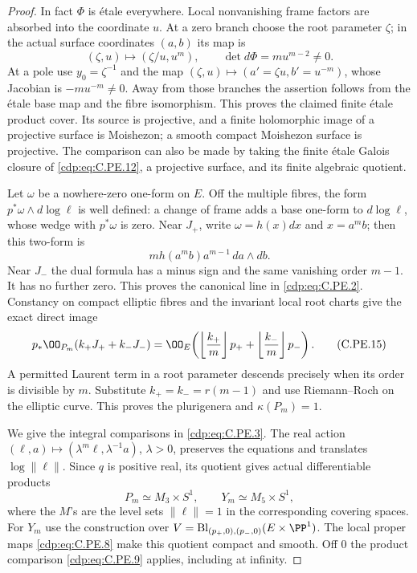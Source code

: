 \begin{proof}
In fact $\Phi$ is \'etale everywhere. Local nonvanishing
frame factors are absorbed into the coordinate $u$.
At a zero branch choose the root parameter $\zeta$;
in the actual surface coordinates
$(a,b)$ its map is
\[
             (\zeta,u)\longmapsto(\zeta/u,u^m),
             \qquad \det d\Phi=m u^{m-2}\ne0.           \tag{C.PE.13}\label{cdp:eq:C.PE.13}
\]
At a pole use $y_0=\zeta^{-1}$ and the map
$(\zeta,u)\mapsto(a'=\zeta u,b'=u^{-m})$, whose
Jacobian is $-m u^{-m}\ne0$. Away from those branches
the assertion follows from the \'etale base map and
the fibre isomorphism. This proves the claimed finite
\'etale product cover. Its source is projective, and
a finite holomorphic image of a projective surface is
Moishezon; a smooth compact Moishezon surface is
projective. The comparison can also be made by taking
the finite \'etale Galois closure of \eqref{cdp:eq:C.PE.12}, a
projective surface, and its finite algebraic quotient.

Let $\omega$ be a nowhere-zero one-form on $E$.
Off the multiple fibres, the form
$p^*\omega\wedge d\log\ell$ is well defined: a change
of frame adds a base one-form to $d\log\ell$, whose
wedge with $p^*\omega$ is zero. Near $J_+$, write
$\omega=h(x)dx$ and $x=a^m b$; then this two-form is
\[
                m h(a^m b)a^{m-1}\,da\wedge db.         \tag{C.PE.14}\label{cdp:eq:C.PE.14}
\]
Near $J_-$ the dual formula has a minus sign and the
same vanishing order $m-1$. It has no further zero.
This proves the canonical line in \eqref{cdp:eq:C.PE.2}. Constancy
on compact elliptic fibres and the invariant local
root charts give the exact direct image
\[
 p_*\OO_{P_m}(k_+J_++k_-J_-)
 =\OO_E\!\left(
  \left\lfloor\frac{k_+}m\right\rfloor p_+
 +\left\lfloor\frac{k_-}m\right\rfloor p_-\right).         \tag{C.PE.15}\label{cdp:eq:C.PE.15}
\]
A permitted Laurent term in a root parameter descends
precisely when its order is divisible by $m$.
Substitute $k_+=k_-=r(m-1)$ and use Riemann--Roch
on the elliptic curve. This proves the plurigenera
and $\kappa(P_m)=1$.

We give the integral comparisons in \eqref{cdp:eq:C.PE.3}. The
real action
$(\ell,a)\mapsto(\lambda^m\ell,\lambda^{-1}a)$,
$\lambda>0$, preserves the equations and translates
$\log\|\ell\|$. Since $q$ is positive real, its
quotient gives actual differentiable products
\[
                   P_m\simeq M_3\times S^1,\qquad
                   Y_m\simeq M_5\times S^1,             \tag{C.PE.16}\label{cdp:eq:C.PE.16}
\]
where the $M$'s are the level sets $\|\ell\|=1$ in
the corresponding covering spaces. For $Y_m$ use
the construction over
$V=\operatorname{Bl}_{(p_+,0),(p_-,0)}(E\times\PP^1)$.
The local proper maps \eqref{cdp:eq:C.PE.8} make this quotient
compact and smooth. Off $0$ the product comparison
\eqref{cdp:eq:C.PE.9} applies, including at infinity.


\end{proof}
